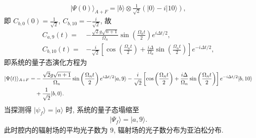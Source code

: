 \documentclass{assignment}
\begin{document}
\begin{sol}
\begin{itemize}
        \begin{align}
            \lvert\Psi(0)\rangle_{A+F}=\lvert b\rangle\otimes\frac{1}{\sqrt{2}}(\lvert 0\rangle-i\lvert 10\rangle),
        \end{align}
        即 $C_{b,0}(0)=\frac{1}{\sqrt{2}}$, $C_{b,10}=-\frac{i}{\sqrt{2}}$,
        故
        \begin{align}
            C_{a,9}(t)=&-\frac{\sqrt{2}g\sqrt{n+1}}{\Omega_n}\sin\left(\frac{\Omega_nt}{2}\right)e^{i\Delta t/2},\\
            C_{b,10}(t)=&-\frac{i}{\sqrt{2}}\left[\cos\left(\frac{\Omega_nt}{2}\right)+\frac{i\Delta}{\Omega_n}\sin\left(\frac{\Omega_nt}{2}\right)\right]e^{-i\Delta t/2},
        \end{align}
        即系统的量子态演化方程为
        \begin{align}
            \notag\lvert\Psi(t)\rangle_{A+F}=&-\frac{\sqrt{2}g\sqrt{n+1}}{\Omega_n}\sin\left(\frac{\Omega_nt}{2}\right)e^{i\Delta t/2}\lvert a,9\rangle-\frac{i}{\sqrt{2}}\left[\cos\left(\frac{\Omega_nt}{2}\right)+\frac{i\Delta}{\Omega_n}\sin\left(\frac{\Omega_nt}{2}\right)\right]e^{-i\Delta t/2}\lvert b,10\rangle\\
            &+\frac{1}{\sqrt{2}}\lvert b,0\rangle.
        \end{align}
        当探测得 $\lvert\psi_f\rangle=\lvert a\rangle$ 时, 系统的量子态塌缩至
        \begin{align}
            \lvert\Psi_f\rangle=\lvert a,9\rangle.
        \end{align}
        此时腔内的辐射场的平均光子数为 $9$, 辐射场的光子数分布为亚泊松分布.
    \end{itemize}
\end{sol}
\end{document}
